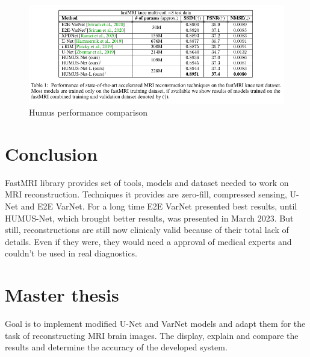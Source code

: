 \documentclass[10pt,a4paper]{article}
\begin{document}
\begin{figure}[H]
\centering
\includegraphics[width=400pt]{./images/humus-perf.png}
\caption{Humus performance comparison}
\end{figure}

\section{Conclusion}

FastMRI library provides set of tools, models and dataset needed to work on MRI reconstruction. Techniques it provides are zero-fill, compressed sensing, U-Net and E2E VarNet. For a long time E2E VarNet presented best results, until HUMUS-Net, which brought better results, was presented in March 2023. But still, reconstructions are still now clinicaly valid because of their total lack of details. Even if they were, they would need a approval of medical experts and couldn't be used in real diagnostics.

\section{Master thesis}

Goal is to implement modified U-Net and VarNet models and adapt them for the task of reconstructing MRI brain images. The display, explain and compare the results and determine the accuracy of the developed system.
\end{document}
